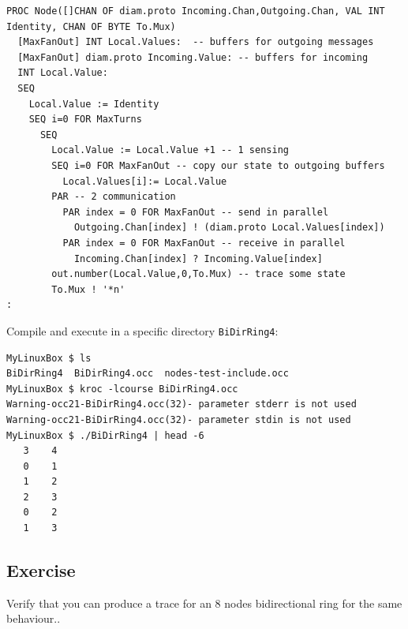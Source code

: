 \documentclass[times]{book}
\begin{document}
\begin{lstlisting} 
PROC Node([]CHAN OF diam.proto Incoming.Chan,Outgoing.Chan, VAL INT Identity, CHAN OF BYTE To.Mux)  
  [MaxFanOut] INT Local.Values:  -- buffers for outgoing messages
  [MaxFanOut] diam.proto Incoming.Value: -- buffers for incoming
  INT Local.Value:
  SEQ
    Local.Value := Identity
    SEQ i=0 FOR MaxTurns 
      SEQ
        Local.Value := Local.Value +1 -- 1 sensing
        SEQ i=0 FOR MaxFanOut -- copy our state to outgoing buffers
          Local.Values[i]:= Local.Value
        PAR -- 2 communication
          PAR index = 0 FOR MaxFanOut -- send in parallel
            Outgoing.Chan[index] ! (diam.proto Local.Values[index])
          PAR index = 0 FOR MaxFanOut -- receive in parallel
            Incoming.Chan[index] ? Incoming.Value[index]
        out.number(Local.Value,0,To.Mux) -- trace some state
        To.Mux ! '*n'
:
\end{lstlisting} 

Compile and execute in a specific directory {\tt BiDirRing4}:

\begin{lstlisting} 
MyLinuxBox $ ls
BiDirRing4  BiDirRing4.occ  nodes-test-include.occ
MyLinuxBox $ kroc -lcourse BiDirRing4.occ
Warning-occ21-BiDirRing4.occ(32)- parameter stderr is not used
Warning-occ21-BiDirRing4.occ(32)- parameter stdin is not used
MyLinuxBox $ ./BiDirRing4 | head -6
   3    4
   0    1
   1    2
   2    3
   0    2
   1    3
\end{lstlisting} 

\subsection {Exercise }

Verify that you can produce a trace for an 8 nodes bidirectional ring
for the same behaviour..



\tableofcontents
\end{document}
